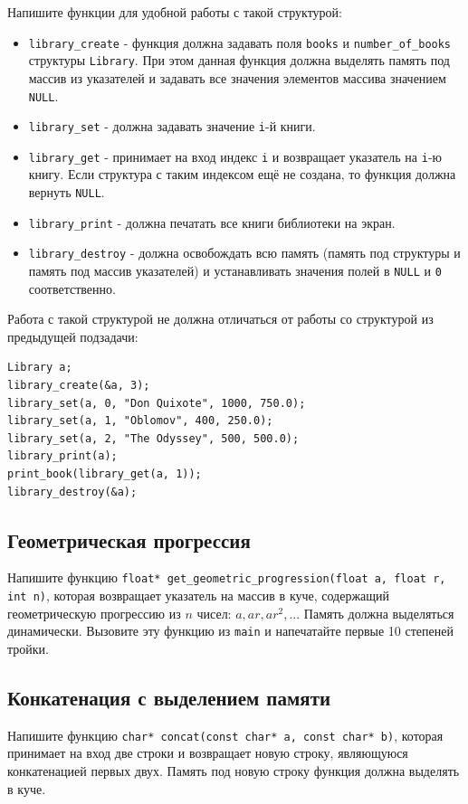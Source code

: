 \documentclass[10pt]{article}
\begin{document}
\begin{enumerate}[a.]
Напишите функции для удобной работы с такой структурой:
\begin{itemize}
\item \texttt{library\_create} - функция должна задавать поля \texttt{books} и \texttt{number\_of\_books} структуры \texttt{Library}. При этом данная функция должна выделять память под массив из указателей и задавать все значения элементов массива значением \texttt{NULL}.
\item \texttt{library\_set} - должна задавать значение \texttt{i}-й книги.
\item \texttt{library\_get} - принимает на вход индекс \texttt{i} и возвращает указатель на \texttt{i}-ю книгу. Если структура с таким индексом ещё не создана, то функция должна вернуть \texttt{NULL}.
\item \texttt{library\_print} - должна печатать все книги библиотеки на экран.
\item \texttt{library\_destroy} - должна освобождать всю память (память под структуры и память под массив указателей) и устанавливать значения полей в \texttt{NULL} и \texttt{0} соответственно.
\end{itemize}

Работа с такой структурой не должна отличаться от работы со структурой из предыдущей подзадачи:
\begin{lstlisting}
Library a;
library_create(&a, 3);
library_set(a, 0, "Don Quixote", 1000, 750.0);
library_set(a, 1, "Oblomov", 400, 250.0);
library_set(a, 2, "The Odyssey", 500, 500.0);
library_print(a);
print_book(library_get(a, 1));
library_destroy(&a);
\end{lstlisting}
\fi
\end{enumerate}




\subsection{Геометрическая прогрессия}
Напишите функцию \texttt{float* get\_geometric\_progression(float a, float r, int n)}, которая возвращает указатель на массив в куче, содержащий геометрическую прогрессию из $n$ чисел: 
$a, ar, ar^2, ...$ 
Память должна выделяться динамически. Вызовите эту функцию из \texttt{main} и напечатайте первые 10 степеней тройки.

\subsection{Конкатенация с выделением памяти}
Напишите функцию \texttt{char* concat(const char* a, const char* b)}, которая принимает на вход две строки и возвращает новую строку, являющуюся конкатенацией первых двух. Память под новую строку функция должна выделять в куче.
\end{document}
